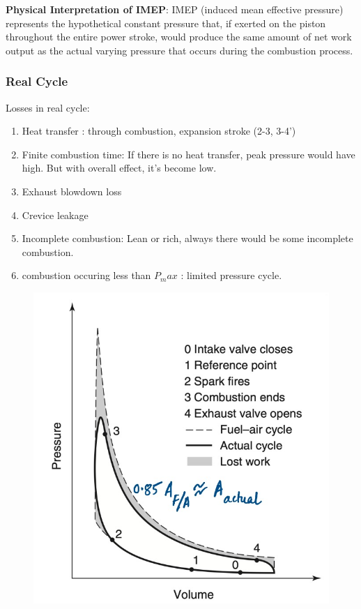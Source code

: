 \documentclass{article}
\begin{document}
\begin{multicols}{2}
		\textbf{Physical Interpretation of IMEP}: IMEP (induced mean effective pressure) represents the hypothetical constant pressure that, if exerted on the piston throughout the entire power stroke, would produce the same amount of net work output as the actual varying pressure that occurs during the combustion process.

		\subsubsection*{Real Cycle}
		Losses in real cycle:
		\begin{enumerate}
			\item Heat transfer : through combustion, expansion stroke (2-3, 3-4')
			\item Finite combustion time: If there is no heat transfer, peak pressure would have high. But with overall effect, it's become low. 
			\item Exhaust blowdown loss
			\item Crevice leakage 
			\item Incomplete combustion: Lean or rich, always there would be some incomplete combustion.
			\item combustion occuring less than $P_max$ : limited pressure cycle.
		\end{enumerate}

		\begin{figure}[H]
			\begin{center}
				\includegraphics[width=\linewidth]{img/real_cycle_loss.jpeg}
			\end{center}
		\end{figure}
	\end{multicols}
\end{document}
